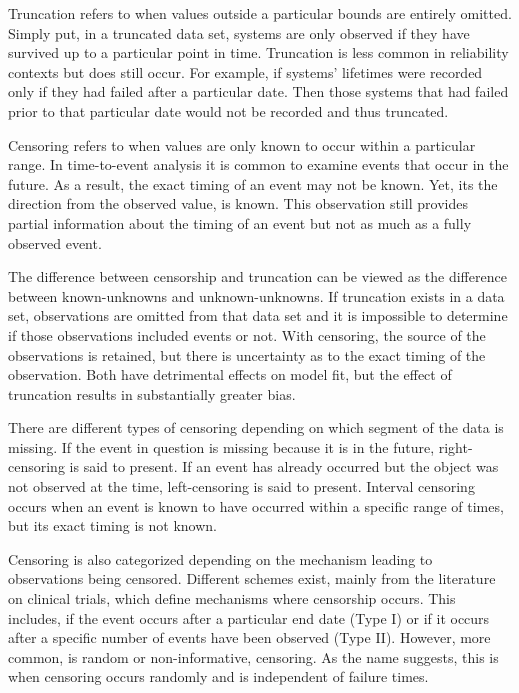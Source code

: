 Truncation refers to when values outside a particular bounds are entirely omitted. Simply put, in a truncated data set, systems are only observed if they have survived up to a particular point in time. Truncation is less common in reliability contexts but does still occur. For example, if systems' lifetimes were recorded only if they had failed after a particular date. Then those systems that had failed prior to that particular date would not be recorded and thus truncated\cite{Hong2009}.

Censoring refers to when values are only known to occur within a particular range. In time-to-event analysis it is common to examine events that occur in the future. As a result, the exact timing of an event may not be known. Yet, its the direction from the observed value, is known. This observation still provides partial information about the timing of an event but not as much as a fully observed event. 

The difference between censorship and truncation can be viewed as the difference between known-unknowns and unknown-unknowns. If truncation exists in a data set, observations are omitted from that data set and it is impossible to determine if those observations included events or not. With censoring, the source of the observations is retained, but there is uncertainty as to the exact timing of the observation. Both have detrimental effects on model fit, but the effect of truncation results in substantially greater bias.

There are different types of censoring depending on which segment of the data is missing. If the event in question is missing because it is in the future, right-censoring is said to present. If an event has already occurred but the object was not observed at the time, left-censoring is said to present. Interval censoring occurs when an event is known to have occurred within a specific range of times, but its exact timing is not known. 

Censoring is also categorized depending on the mechanism leading to observations being censored. Different schemes exist, mainly from the literature on clinical trials, which define mechanisms where censorship occurs. This includes, if the event occurs after a particular end date (Type I) or if it occurs after a specific number of events have been observed (Type II). However, more common, is random or non-informative, censoring. As the name suggests, this is when censoring occurs randomly and is independent of failure times.

